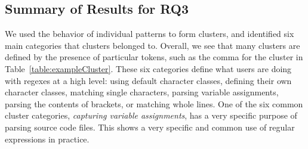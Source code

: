 \subsection{Summary of Results for RQ3}
\label{sec:clusterResults}
We used the behavior of individual patterns to form clusters, and identified six main categories that clusters belonged to.  Overall, we see that many clusters are defined by the presence of particular tokens, such as the comma for the cluster in Table~\ref{table:exampleCluster}.
These six categories define what users are doing with regexes at a high level: using default character classes, defining their own character classes, matching single characters, parsing variable assignments, parsing the contents of brackets, or matching whole lines.
 One of the six common cluster categories, \emph{capturing variable assignments}, has a very specific purpose of parsing source code files. This shows a very specific and common use of regular expressions in practice.















